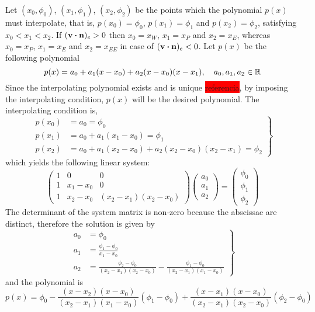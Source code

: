 \noindent
Let $(x_0, \phi_0)$, $(x_1, \phi_1)$, $(x_2, \phi_2)$ be the points which the polynomial $p(x)$ must interpolate, that is, $p(x_0) = \phi_0$, $p(x_1) = \phi_1$ and $p(x_2) = \phi_2$, satisfying $x_0 < x_1 < x_2$. If $(\vb{v} \vdot \vb{n})_e > 0$ then $x_0 = x_W$, $x_1 = x_P$ and $x_2 = x_E$, whereas $x_0 = x_P$, $x_1 = x_E$ and $x_2 = x_{EE}$ in case of $(\vb{v} \vdot \vb{n})_e < 0$. Let $p(x)$ be the following polynomial
\begin{equation}
	p(x) = a_0 + a_1 (x - x_0) + a_2 (x - x_0) (x - x_1), \quad a_0, a_1, a_2 \in \mathbb{R}
\end{equation}
Since the interpolating polynomial exists and is unique \colorbox{red}{referencia}, by imposing the interpolating condition, $p(x)$ will be the desired polynomial. The interpolating condition is,
\begin{equation}
	\left.
	\begin{aligned}
		p(x_0) &= a_0 = \phi_0 \\
		p(x_1) &= a_0 + a_1 (x_1 - x_0) = \phi_1 \\
		p(x_2) &= a_0 + a_1 (x_2 - x_0) + a_2 (x_2 - x_0) (x_2 - x_1) = \phi_2
	\end{aligned}	
	\right\}
\end{equation}
which yields the following linear system:
\begin{equation}
	\begin{pmatrix}
		1 & 0 & 0 \\
		1 & x_1 - x_0 & 0 \\
		1 & x_2 - x_0 & (x_2 - x_1)(x_2 - x_0)
	\end{pmatrix}
	\begin{pmatrix}
		a_0 \\ a_1 \\ a_2
	\end{pmatrix} = 
	\begin{pmatrix}
		\phi_0 \\ \phi_1 \\ \phi_2
	\end{pmatrix}
\end{equation}
The determinant of the system matrix is non-zero because the abscissae are distinct, therefore the solution is given by
\begin{equation}
	\left.
	\begin{aligned}
		a_0 &= \phi_0 \\
		a_1 &= \frac{\phi_1 - \phi_0}{x_1 - x_0} \\
		a_2 &= \frac{\phi_2 - \phi_0}{(x_2 - x_1)(x_2 - x_0)} - \frac{\phi_1 - \phi_0}{(x_2 - x_1)(x_1 - x_0)}
	\end{aligned}	
	\right\}
\end{equation}
and the polynomial is
\begin{equation} \label{eq:quick_polynomial_1}
	p(x) = 
	\phi_0 - 
	\frac{(x - x_2) (x - x_0)}{(x_2 - x_1)(x_1 - x_0)} (\phi_1 - \phi_0) + 
	\frac{(x - x_1)(x - x_0)}{(x_2 - x_1)(x_2 - x_0)} (\phi_2 - \phi_0)
\end{equation}

